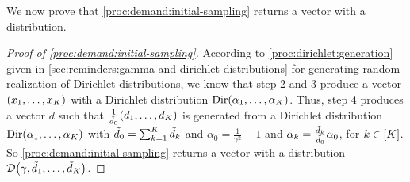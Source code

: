 We now prove that \cref{proc:demand:initial-sampling} returns a vector with a \distrib distribution.


\begin{proof}[Proof of \cref{proc:demand:initial-sampling}]
According to \cref{proc:dirichlet:generation} given in \cref{sec:reminders:gamma-and-dirichlet-distributions} for generating random realization of Dirichlet distributions, we know that step 2 and 3 produce a vector $\bracket{x_1,\ldots,x_K}$ with a Dirichlet distribution $\Dir\bracket{\alpha_1,\ldots,\alpha_K}$.
Thus, step 4 produces a vector $d$ such that $\frac{1}{\tilde{\demand}_0}\bracket{\demand_1,\ldots,\demand_K}$ is generated from a Dirichlet distribution $\Dir\bracket{\alpha_1,\ldots,\alpha_K}$ with $\tilde{d}_0 = \sum_{k=1}^K\tilde{d}_k$ and $\alpha_0 = \frac{1}{\gamma^2}-1$ and $\alpha_k=\frac{\tilde{d}_k}{\tilde{d}_0}\alpha_0$, for $k\in\range{K}$.
So \cref{proc:demand:initial-sampling} returns a vector with a \distrib distribution $\cD\bracket{\gamma,\tilde{\demand}_1,\ldots,\tilde{\demand}_K}$.
\end{proof}






